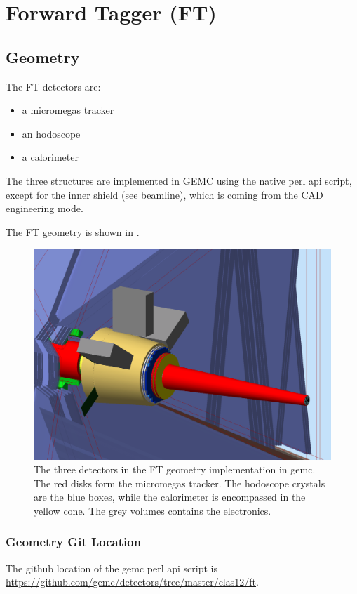 \section{Forward Tagger (FT)}


\subsection{Geometry}

The FT detectors are:

\begin{itemize}
	\item a micromegas tracker
	\item an hodoscope
 	\item a calorimeter
\end{itemize}

The three structures are implemented in GEMC using the native perl api script, except for the inner shield (see beamline), which is coming from the CAD engineering mode.

The FT geometry is shown in .


\begin{figure}
	\centering
	\includegraphics[width=0.95\columnwidth,keepaspectratio]{img/ftGeometry.png}
	\caption{The three detectors in the FT geometry implementation in gemc. The red disks form the micromegas tracker. The hodoscope crystals are the blue boxes,
            while the calorimeter is encompassed in the yellow cone. The grey volumes contains the electronics.}
	\label{fig:ftGeometry}
\end{figure}




\subsubsection{Geometry Git Location}
The github location of the gemc perl api script is \url{https://github.com/gemc/detectors/tree/master/clas12/ft}.


